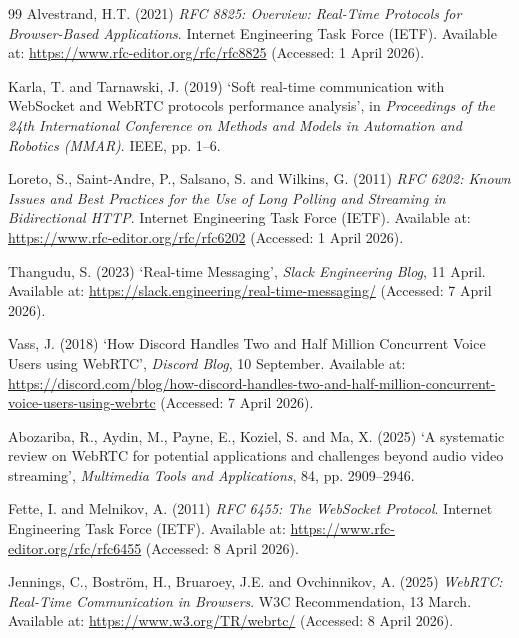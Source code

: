 \documentclass[12pt,a4paper]{article}
\begin{document}
\begin{thebibliography}{99}
Alvestrand, H.T. (2021) \textit{RFC 8825: Overview: Real-Time Protocols for Browser-Based Applications}. Internet Engineering Task Force (IETF). Available at: \url{https://www.rfc-editor.org/rfc/rfc8825} (Accessed: 1 April 2026).

Karla, T. and Tarnawski, J. (2019) `Soft real-time communication with WebSocket and WebRTC protocols performance analysis', in \textit{Proceedings of the 24th International Conference on Methods and Models in Automation and Robotics (MMAR)}. IEEE, pp. 1--6.

Loreto, S., Saint-Andre, P., Salsano, S. and Wilkins, G. (2011) \textit{RFC 6202: Known Issues and Best Practices for the Use of Long Polling and Streaming in Bidirectional HTTP}. Internet Engineering Task Force (IETF). Available at: \url{https://www.rfc-editor.org/rfc/rfc6202} (Accessed: 1 April 2026).

Thangudu, S. (2023) `Real-time Messaging', \textit{Slack Engineering Blog}, 11 April. Available at: \url{https://slack.engineering/real-time-messaging/} (Accessed: 7 April 2026).

Vass, J. (2018) `How Discord Handles Two and Half Million Concurrent Voice Users using WebRTC', \textit{Discord Blog}, 10 September. Available at: \url{https://discord.com/blog/how-discord-handles-two-and-half-million-concurrent-voice-users-using-webrtc} (Accessed: 7 April 2026).

Abozariba, R., Aydin, M., Payne, E., Koziel, S. and Ma, X. (2025) `A systematic review on WebRTC for potential applications and challenges beyond audio video streaming', \textit{Multimedia Tools and Applications}, 84, pp. 2909--2946.

Fette, I. and Melnikov, A. (2011) \textit{RFC 6455: The WebSocket Protocol}. Internet Engineering Task Force (IETF). Available at: \url{https://www.rfc-editor.org/rfc/rfc6455} (Accessed: 8 April 2026).

Jennings, C., Bostr\"{o}m, H., Bruaroey, J.E. and Ovchinnikov, A. (2025) \textit{WebRTC: Real-Time Communication in Browsers}. W3C Recommendation, 13 March. Available at: \url{https://www.w3.org/TR/webrtc/} (Accessed: 8 April 2026).

\end{thebibliography}
\end{document}
